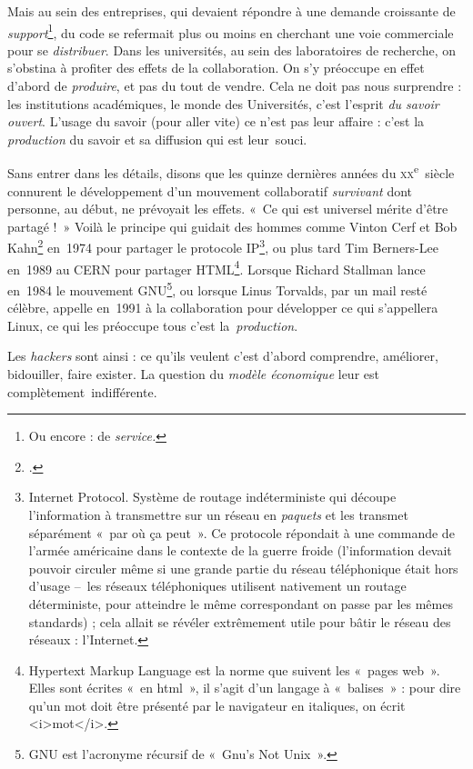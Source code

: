 \documentclass{FramateX}
\begin{document}
\begin{refsection}
Mais au sein des entreprises, qui devaient répondre à une demande
croissante de \textit{support}\footnote{Ou encore : de
\textit{service.}}, du code se refermait plus ou moins en
cherchant une voie commerciale pour se \textit{distribuer}. Dans les
universités, au sein des laboratoires de recherche, on s'obstina à
profiter des effets de la collaboration. On s'y préoccupe en effet
d'abord de \textit{produire}, et pas du tout de vendre. Cela ne doit
pas nous surprendre : les institutions académiques, le monde des
Universités, c'est l'esprit\textit{ du savoir ouvert}. L'usage du
savoir (pour aller vite) ce n'est pas leur affaire : c'est la
\textit{production} du savoir et sa diffusion qui est leur~souci.

Sans entrer dans les détails, disons que les quinze dernières années du
\textsc{xx}\textsuperscript{e}~siècle connurent le développement d'un
mouvement collaboratif \textit{survivant }dont personne, au début, ne
prévoyait les effets. «~Ce qui est universel mérite d'être partagé !~»
Voilà le principe qui guidait des hommes comme Vinton Cerf et Bob
Kahn\footnote{\cite{cerfprotocol1974}.}
en~1974 pour partager le protocole IP\footnote{Internet Protocol.
Système de routage indéterministe qui découpe l'information à
transmettre sur un réseau en \textit{paquets} et les transmet
séparément «~par où ça peut~». Ce protocole répondait à une commande
de l'armée américaine dans le contexte de la guerre froide
(l'information devait pouvoir circuler même si une grande partie du
réseau téléphonique était hors d'usage –~les réseaux téléphoniques
utilisent nativement un routage déterministe, pour atteindre le même
correspondant on passe par les mêmes standards) ; cela allait se
révéler extrêmement utile pour bâtir le réseau des réseaux :
l'Internet.}, ou plus tard Tim Berners-Lee en~1989 au CERN pour
partager HTML\footnote{Hypertext Markup Language est la norme que
suivent les «~pages web~». Elles sont écrites «~en html~», il s'agit
d'un langage à «~balises~» : pour dire qu'un mot doit être présenté par
le navigateur en italiques, on écrit
{\textless}i{\textgreater}mot{\textless}/i{\textgreater}.}. Lorsque
Richard Stallman lance en~1984 le mouvement GNU\footnote{GNU est
l'acronyme récursif de «~Gnu's Not Unix~».}, ou lorsque Linus Torvalds,
par un mail resté célèbre, appelle en~1991 à la collaboration pour
développer ce qui s'appellera Linux, ce qui les préoccupe tous c'est
la~\textit{production}. 

Les \textit{hackers} sont ainsi : ce qu'ils veulent c'est d'abord
comprendre, améliorer, bidouiller, faire exister. La question du
\textit{modèle économique} leur est complètement~indifférente.


\end{refsection}
\end{document}
